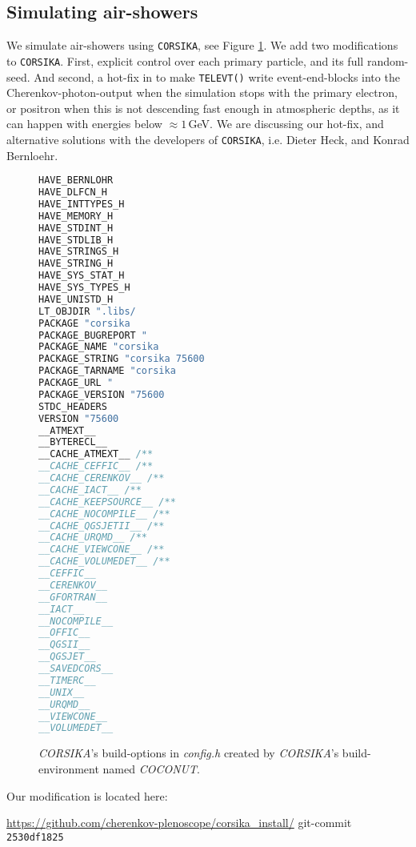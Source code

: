 \documentclass[a4paper,12pt,oneside]{article}
\begin{document}
\subsection{Simulating air-showers}
%
We simulate air-showers using \texttt{CORSIKA}, see Figure \ref{FigCorsika}.
%
We add two modifications to \texttt{CORSIKA}.
%
First, explicit control over each primary particle, and its full random-seed.
%
And second, a hot-fix in
\noindent to make \texttt{TELEVT()} write event-end-blocks into the Cherenkov-photon-output when the simulation stops with the primary electron, or positron when this is not descending fast enough in atmospheric depths, as it can happen with energies below $\approx 1\,$GeV.
%
We are discussing our hot-fix, and alternative solutions with the developers of \texttt{CORSIKA}, i.e. Dieter Heck, and Konrad Bernloehr.
%
\begin{figure}[H]
\begin{lstlisting}[language=C,basicstyle=\tiny\ttfamily]
HAVE_BERNLOHR
HAVE_DLFCN_H
HAVE_INTTYPES_H
HAVE_MEMORY_H
HAVE_STDINT_H
HAVE_STDLIB_H
HAVE_STRINGS_H
HAVE_STRING_H
HAVE_SYS_STAT_H
HAVE_SYS_TYPES_H
HAVE_UNISTD_H
LT_OBJDIR ".libs/
PACKAGE "corsika
PACKAGE_BUGREPORT "
PACKAGE_NAME "corsika
PACKAGE_STRING "corsika 75600
PACKAGE_TARNAME "corsika
PACKAGE_URL "
PACKAGE_VERSION "75600
STDC_HEADERS
VERSION "75600
__ATMEXT__
__BYTERECL__
__CACHE_ATMEXT__ /**
__CACHE_CEFFIC__ /**
__CACHE_CERENKOV__ /**
__CACHE_IACT__ /**
__CACHE_KEEPSOURCE__ /**
__CACHE_NOCOMPILE__ /**
__CACHE_QGSJETII__ /**
__CACHE_URQMD__ /**
__CACHE_VIEWCONE__ /**
__CACHE_VOLUMEDET__ /**
__CEFFIC__
__CERENKOV__
__GFORTRAN__
__IACT__
__NOCOMPILE__
__OFFIC__
__QGSII__
__QGSJET__
__SAVEDCORS__
__TIMERC__
__UNIX__
__URQMD__
__VIEWCONE__
__VOLUMEDET__
\end{lstlisting}
\caption{%
    \textit{CORSIKA}'s build-options in \textit{config.h} created by \textit{CORSIKA}'s build-environment named \textit{COCONUT}.
}
\label{FigCorsika}
\end{figure}
%
Our modification is located here:\\
%
\begin{center}
\url{https://github.com/cherenkov-plenoscope/corsika_install/}
git-commit \texttt{2530df1825}
\end{center}
%
\end{document}
